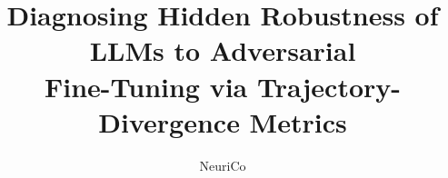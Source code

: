 \documentclass{article}
\title{Diagnosing Hidden Robustness of LLMs to Adversarial\\
Fine-Tuning via Trajectory-Divergence Metrics}
\author{NeuriCo}
\begin{document}
\maketitle

\begin{abstract}

\end{abstract}









\end{document}
